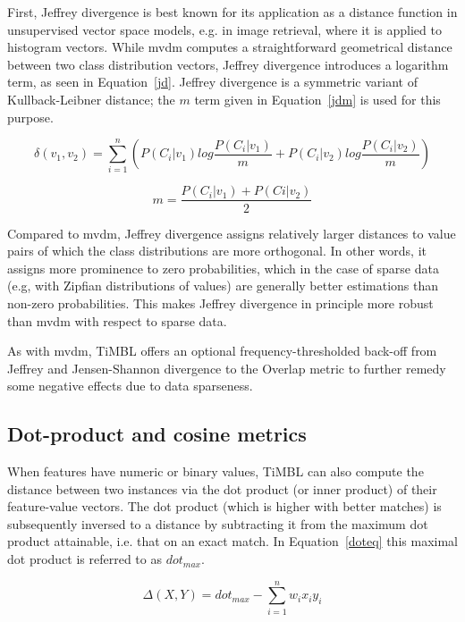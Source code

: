 \documentclass{book}
\begin{document}
First, Jeffrey divergence is best known for its application as a
distance function in unsupervised vector space models, e.g. in image
retrieval, where it is applied to histogram vectors. While {\sc mvdm}
computes a straightforward geometrical distance between two class
distribution vectors, Jeffrey divergence introduces a logarithm term,
as seen in Equation~\ref{jd}. Jeffrey divergence is a symmetric
variant of Kullback-Leibner distance; the $m$ term given in
Equation~\ref{jdm} is used for this purpose.

\begin{equation}
\delta(v_{1}, v_{2}) = \sum_{i=1}^{n}
( P(C_{i}|v_{1}) log \frac{P(C_{i}|v_{1})}{m} +
  P(C_{i}|v_{2}) log \frac{P(C_{i}|v_{2})}{m} )
\label{jd}
\end{equation}

\begin{equation}
m = \frac{P(C_{i}|v_{1}) + P(C{i}|v_{2})}{2}
\label{jdm}
\end{equation}

Compared to {\sc mvdm}, Jeffrey divergence assigns relatively larger
distances to value pairs of which the class distributions are more
orthogonal. In other words, it assigns more prominence to zero
probabilities, which in the case of sparse data (e.g, with Zipfian
distributions of values) are generally better estimations than
non-zero probabilities. This makes Jeffrey divergence in principle
more robust than {\sc mvdm} with respect to sparse data.

As with {\sc mvdm}, TiMBL offers an optional frequency-thresholded
back-off from Jeffrey and Jensen-Shannon divergence to the Overlap metric to further
remedy some negative effects due to data sparseness.

\subsection{Dot-product and cosine metrics}
\label{dotproduct}

When features have numeric or binary values, TiMBL can also compute
the distance between two instances via the dot product (or inner product)
of their feature-value vectors. The dot product (which is higher with better
matches) is subsequently inversed to a distance by subtracting it from
the maximum dot product attainable, i.e. that on an exact match. In
Equation~\ref{doteq} this maximal dot product is referred to as $dot_{max}$.

\begin{equation}
\label{doteq}
\Delta(X,Y) = dot_{max} - \sum_{i=1}^{n} w_{i} x_{i} y_{i}
\end{equation}
\end{document}
